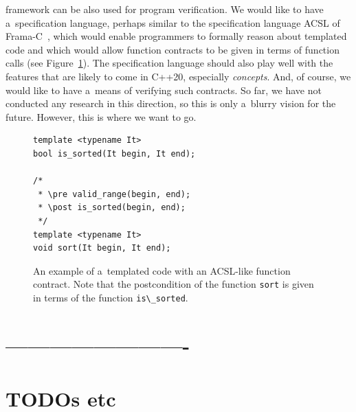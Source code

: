 \documentclass[nolot,nolof,nocover,printed]{fithesis3}
\begin{document}
\K framework can be also used for program verification. We would like to have a~specification language, perhaps similar to the specification language ACSL of Frama-C~\cite{Cuoq2012}, which would enable programmers to formally reason about templated code and which would allow function contracts to be given in terms of function calls (see Figure~\ref{fig:contractsExample}). The specification language should also play well with the features that are likely to come in C++20, especially \textit{concepts}. And, of course, we would like to have a~means of verifying such contracts. So far, we have not conducted any research in this direction, so this is only a~blurry vision for the future. However, this is where we want to go.

\begin{figure}
\begin{lstlisting}
template <typename It>
bool is_sorted(It begin, It end);

/*
 * \pre valid_range(begin, end);
 * \post is_sorted(begin, end);
 */
template <typename It>
void sort(It begin, It end);
\end{lstlisting}
\caption{An example of a~templated code with an ACSL-like function contract. Note that the postcondition of the function \lstinline|sort| is given in terms of the function \lstinline|is\_sorted|.}
\label{fig:contractsExample}
\end{figure}

\ifshowoldstuff

\chapter{-------------------------}
\chapter{TODOs etc}



\end{document}
